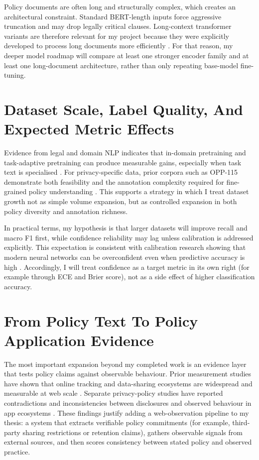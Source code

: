 \documentclass[12pt]{article}
\begin{document}
Policy documents are often long and structurally complex, which creates an architectural constraint. Standard BERT-length inputs force aggressive truncation and may drop legally critical clauses. Long-context transformer variants are therefore relevant for my project because they were explicitly developed to process long documents more efficiently \citep{beltagy2020longformer}. For that reason, my deeper model roadmap will compare at least one stronger encoder family and at least one long-document architecture, rather than only repeating base-model fine-tuning.

\section{Dataset Scale, Label Quality, And Expected Metric Effects}
Evidence from legal and domain NLP indicates that in-domain pretraining and task-adaptive pretraining can produce measurable gains, especially when task text is specialised \citep{gururangan2020dontstop,chalkidis2020legalbert}. For privacy-specific data, prior corpora such as OPP-115 demonstrate both feasibility and the annotation complexity required for fine-grained policy understanding \citep{wilson2016opp115}. This supports a strategy in which I treat dataset growth not as simple volume expansion, but as controlled expansion in both policy diversity and annotation richness.

In practical terms, my hypothesis is that larger datasets will improve recall and macro F1 first, while confidence reliability may lag unless calibration is addressed explicitly. This expectation is consistent with calibration research showing that modern neural networks can be overconfident even when predictive accuracy is high \citep{guo2017calibration}. Accordingly, I will treat confidence as a target metric in its own right (for example through ECE and Brier score), not as a side effect of higher classification accuracy.

\section{From Policy Text To Policy Application Evidence}
The most important expansion beyond my completed work is an evidence layer that tests policy claims against observable behaviour. Prior measurement studies have shown that online tracking and data-sharing ecosystems are widespread and measurable at web scale \citep{englehardt2016tracking}. Separate privacy-policy studies have reported contradictions and inconsistencies between disclosures and observed behaviour in app ecosystems \citep{okoyomon2019notice,andow2019policylint}. These findings justify adding a web-observation pipeline to my thesis: a system that extracts verifiable policy commitments (for example, third-party sharing restrictions or retention claims), gathers observable signals from external sources, and then scores consistency between stated policy and observed practice.
\end{document}
